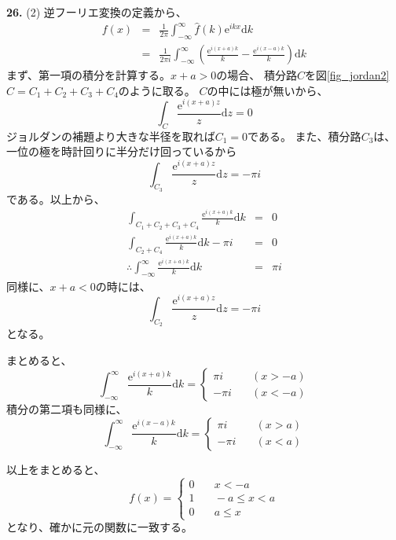 \documentclass{jarticle}
\newcommand{\diff}{\mathrm d}
\newcommand{\ans}[2]{\noindent\\ {\bf \large #1.} (#2)}
\newcommand{\e}{\mathrm e}
\begin{document}
\ans{26}{2}
逆フーリエ変換の定義から、
\begin{eqnarray}
  f(x) &=& \frac{1}{2\pi} \int_{-\infty}^{\infty} \hat{f}(k) \e^{ikx} \diff k \\
  &=& \frac{1}{2\pi i}\int_{-\infty}^{\infty} \left( \frac{\e^{i(x+a)k}}{k} - \frac{\e^{i(x-a)k}}{k} \right) \diff k
\end{eqnarray}
まず、第一項の積分を計算する。$x+a>0$の場合、
積分路$C$を図\ref{fig_jordan2}
$C = C_1 + C_2 + C_3 + C_4$のように取る。
$C$の中には極が無いから、
\begin{equation}
  \int_{C} \frac{\e^{i(x+a)z}}{z} \diff z = 0
\end{equation}
ジョルダンの補題より大きな半径を取れば$C_1= 0$である。
また、積分路$C_3$は、一位の極を時計回りに半分だけ回っているから
\begin{equation}
  \int_{C_3} \frac{\e^{i(x+a)z}}{z} \diff z = - \pi i
\end{equation}
である。以上から、
\begin{eqnarray}
  \int_{C_1+C_2+C_3+C_4} \frac{\e^{i(x+a)k}}{k} \diff k &= &0 \\
  \int_{C_2+C_4} \frac{\e^{i(x+a)k}}{k} \diff k - \pi i &= &0 \\
  \therefore \int_{-\infty}^{\infty} \frac{\e^{i(x+a)k}}{k} \diff k &=& \pi i
\end{eqnarray}
同様に、$x+a <0$の時には、
\begin{equation}
  \int_{C_2} \frac{\e^{i(x+a)z}}{z} \diff z = - \pi i
\end{equation}
となる。

まとめると、
\begin{equation}
  \int_{-\infty}^{\infty} \frac{\e^{i(x+a)k}}{k} \diff k =
  \left\{
  \begin{array}{cc}
    \pi i  & \quad (x > -a) \\
    -\pi i & \quad (x < -a)
  \end{array}
  \right.
\end{equation}
積分の第二項も同様に、
\begin{equation}
  \int_{-\infty}^{\infty} \frac{\e^{i(x-a)k}}{k} \diff k =
  \left\{
  \begin{array}{cc}
    \pi i  & \quad (x>a) \\
    -\pi i & \quad (x<a)
  \end{array}
  \right.
\end{equation}

以上をまとめると、
\begin{equation}
  f(x) = \left\{
  \begin{array}{cc}
    0 & \quad x < -a        \\
    1 & \quad -a \leq x < a \\
    0 & \quad a \leq x
  \end{array}
  \right.
\end{equation}
となり、確かに元の関数に一致する。
\end{document}
